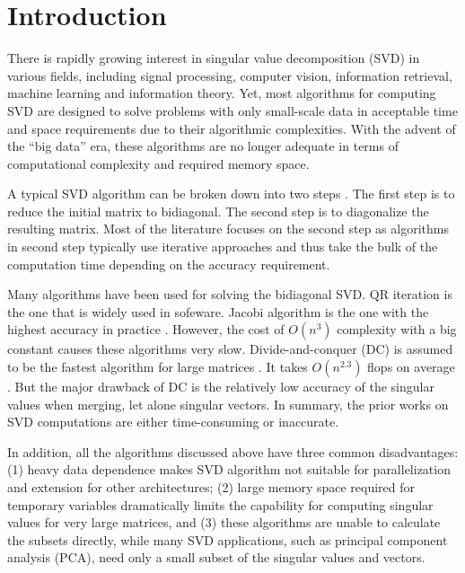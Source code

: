 \section{Introduction}
\label{sec:intro}
There is rapidly growing interest in singular value decomposition (SVD) in various fields,
including signal processing, computer vision, information retrieval, machine learning and information theory.
Yet, most algorithms for computing SVD are designed to solve problems
with only small-scale data in acceptable time and space requirements
due to their algorithmic complexities.
With the advent of the ``big data'' era, these algorithms are no longer adequate in terms of computational complexity and required memory space.

A typical SVD algorithm can be broken down into two steps \cite{65SIAM}.
The first step is to reduce the initial matrix to bidiagonal. %
The second step is to diagonalize the resulting matrix. %
Most of the literature focuses on the second step as algorithms in second step typically use iterative approaches \cite{58iter1,90iter2,65iter3} and thus take the bulk of the computation time depending on the accuracy requirement.

Many algorithms have been used for solving the bidiagonal SVD.
QR iteration is the one that is widely used in sofeware.
Jacobi algorithm is the one with the highest accuracy in practice \cite{97bookalgebra}.
However, the cost of $O(n^3)$ complexity with a big constant causes these algorithms very slow. %
Divide-and-conquer (DC) is assumed to be the fastest algorithm for large matrices \cite{94DCSVD}.
It takes $O(n^{2.3})$ flops on average \cite{97bookalgebra}. 
But the major drawback of DC is the relatively low accuracy of the
singular values when merging, let alone singular vectors. 
In summary, the prior works on SVD computations are either time-consuming or inaccurate.

In addition, all the algorithms discussed above have three common disadvantages:
(1) heavy data dependence makes SVD algorithm not suitable for parallelization and extension for other architectures;
(2) large memory space required for temporary variables dramatically limits the capability for computing singular values for very large matrices, and
(3) these algorithms are unable to calculate the subsets directly, while many SVD applications, such as principal component analysis (PCA), 
need only a small subset of the singular values and vectors.

